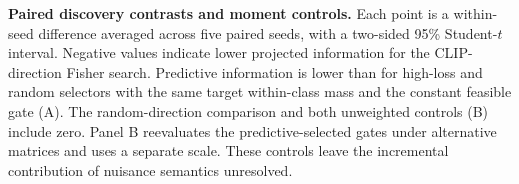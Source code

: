 \textbf{Paired discovery contrasts and moment controls.}
Each point is a within-seed difference averaged across five paired seeds, with a two-sided 95\% Student-$t$ interval. Negative values indicate lower projected information for the CLIP-direction Fisher search. Predictive information is lower than for high-loss and random selectors with the same target within-class mass and the constant feasible gate (A). The random-direction comparison and both unweighted controls (B) include zero. Panel B reevaluates the predictive-selected gates under alternative matrices and uses a separate scale. These controls leave the incremental contribution of nuisance semantics unresolved.
